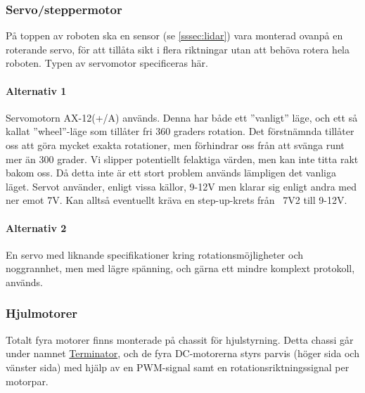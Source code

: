 \documentclass[a4paper,11pt]{article}
\begin{document}
\subsubsection{Servo/steppermotor} \label{ssec:servomotor}
På toppen av roboten ska en sensor (se \ref{sssec:lidar}) vara monterad ovanpå en roterande servo, för att tillåta sikt i flera riktningar utan att behöva rotera hela roboten. Typen av servomotor specificeras här.

\paragraph{Alternativ 1}
Servomotorn AX-12(+/A) används. Denna har både ett ''vanligt'' läge, och ett så kallat ''wheel''-läge som tillåter fri 360 graders rotation. Det förstnämnda tillåter oss att göra mycket exakta rotationer, men förhindrar oss från att svänga runt mer än 300 grader. Vi slipper potentiellt felaktiga värden, men kan inte titta rakt bakom oss. Då detta inte är ett stort problem används lämpligen det vanliga läget. Servot använder, enligt vissa källor, 9-12V men klarar sig enligt andra med ner emot 7V. Kan alltså eventuellt kräva en step-up-krets från ~7V2 till 9-12V.

\paragraph{Alternativ 2}
En servo med liknande specifikationer kring rotationsmöjligheter och noggrannhet, men med lägre spänning, och gärna ett mindre komplext protokoll, används.


\subsubsection{Hjulmotorer}
Totalt fyra motorer finns monterade på chassit för hjulstyrning. Detta chassi går under namnet \href{https://docs.isy.liu.se/pub/VanHeden/DataSheets/terminator_prel.pdf}{Terminator}, och de fyra DC-motorerna styrs parvis (höger sida och vänster sida) med hjälp av en PWM-signal samt en rotationsriktningssignal per motorpar.
\end{document}
